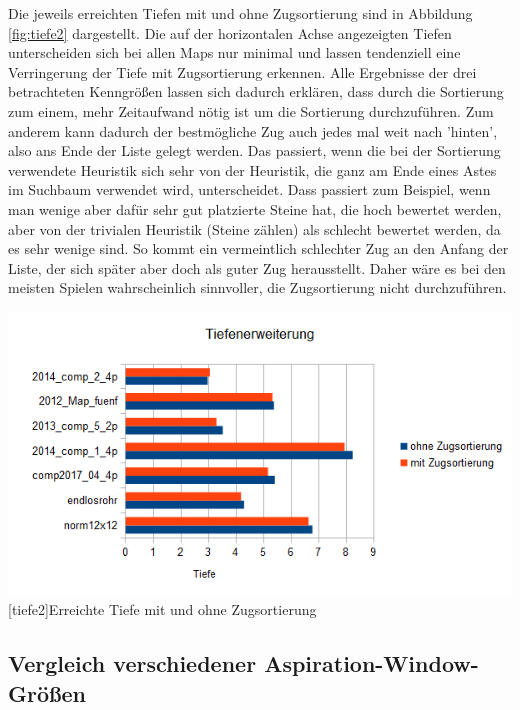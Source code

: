 \documentclass[12pt,a4paper,bibliography=totocnumbered,listof=totocnumbered]{scrartcl}
\begin{document}
    Die jeweils erreichten Tiefen mit und ohne Zugsortierung sind in Abbildung \ref{fig:tiefe2} dargestellt. Die auf der horizontalen Achse angezeigten Tiefen unterscheiden sich bei allen Maps nur minimal und lassen tendenziell eine Verringerung der Tiefe mit Zugsortierung erkennen.\newline\newline
    Alle Ergebnisse der drei betrachteten Kenngrößen lassen sich dadurch erklären, dass durch die Sortierung zum einem, mehr Zeitaufwand nötig ist um die Sortierung durchzuführen. Zum anderem kann dadurch der bestmögliche Zug auch jedes mal weit nach 'hinten', also ans Ende der Liste gelegt werden. Das passiert, wenn die bei der Sortierung verwendete Heuristik sich sehr von der Heuristik, die ganz am Ende eines Astes im Suchbaum verwendet wird, unterscheidet. Dass passiert zum Beispiel, wenn man wenige aber dafür sehr gut platzierte Steine hat, die hoch bewertet werden, aber von der trivialen Heuristik (Steine zählen) als schlecht bewertet werden, da es sehr wenige sind.
    So kommt ein vermeintlich schlechter Zug an den Anfang der Liste, der sich später aber doch als guter Zug herausstellt.\newline
    Daher wäre es bei den meisten Spielen wahrscheinlich sinnvoller, die Zugsortierung nicht durchzuführen.
    
    \vspace{1em}
    \begin{minipage}{\linewidth}
    	\centering
    	\includegraphics[width=1\linewidth]{pics/Kapitel_4/TiefeZugSort.png}
    	[tiefe2]{Erreichte Tiefe mit und ohne Zugsortierung}
    	\label{fig:tiefe2}
    \end{minipage}
    \vspace{1em}
    

    \subsection{Vergleich verschiedener Aspiration-Window-Größen}
    \vspace{1em}
\end{document}

